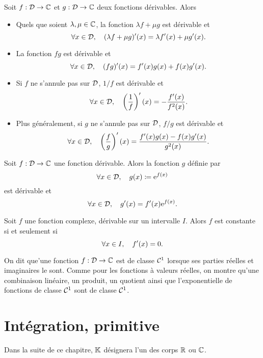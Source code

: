 \documentclass{magnolia}
\begin{document}
\begin{proposition}[utile=-3, nom={Théorèmes usuels}]
Soit $f:\mathcal{D}\to\mathbb{C}$ et $g:\mathcal{D}\to\mathbb{C}$ deux fonctions dérivables. Alors
\begin{itemize}
\item Quels que soient $\lambda,\mu\in\mathbb{C}$, la fonction
  $\lambda f+\mu g$ est dérivable et
  \[\forall x\in\mathcal{D},\quad (\lambda f+\mu g)'(x)=\lambda f'(x)+\mu g'(x).\]
\item La fonction $fg$ est dérivable et
  \[\forall x\in\mathcal{D},\quad (fg)'(x)=f'(x)g(x)+f(x)g'(x).\]
\item Si $f$ ne s'annule pas sur $\mathcal{D}$, $1/f$ est dérivable et
  \[\forall x\in\mathcal{D},\quad \left(\frac{1}{f}\right)'(x)=-\frac{f'(x)}{f^2(x)}.\]
\item Plus généralement, si $g$ ne s'annule pas sur $\mathcal{D}$, $f/g$ est dérivable
  et
  \[\forall x\in\mathcal{D},\quad \left(\frac{f}{g}\right)'(x)=\frac{f'(x)g(x)-f(x)g'(x)}{g^2(x)}.\]
\end{itemize}
\end{proposition}

\begin{proposition}[utile=-3]
Soit $f:\mathcal{D}\to\mathbb{C}$ une fonction dérivable. Alors la fonction $g$ définie par
\[\forall x\in\mathcal{D},\quad g(x)\coloneqq {\rm e}^{f(x)}\]
est dérivable et
\[\forall x\in\mathcal{D},\quad g'(x)=f'(x){\rm e}^{f(x)}.\]
\end{proposition}


\begin{proposition}[utile=3]
  Soit $f$ une fonction complexe, dérivable sur un intervalle $I$. Alors $f$ est
  constante si et seulement si
  \[\forall x\in I ,\quad f'(x)=0.\]
  \end{proposition}

\begin{remarqueUnique}
\remarque On dit que'une fonction $f:\mathcal{D}\to\mathbb{C}$ est de classe $\mathcal{C}^{1}$ lorsque ses
  parties réelles et imaginaires le sont. Comme pour les fonctions à valeurs réelles, on
  montre qu'une combinaison linéaire, un produit, un quotient ainsi que l'exponentielle de fonctions
  de classe $\mathcal{C}^{1}$ sont de classe $\mathcal{C}^{1}$.
\end{remarqueUnique}

\section{Intégration, primitive}

Dans la suite de ce chapitre, $\mathbb{K}$ désignera l'un des corps $\mathbb{R}$ ou $\mathbb{C}$.
\end{document}
